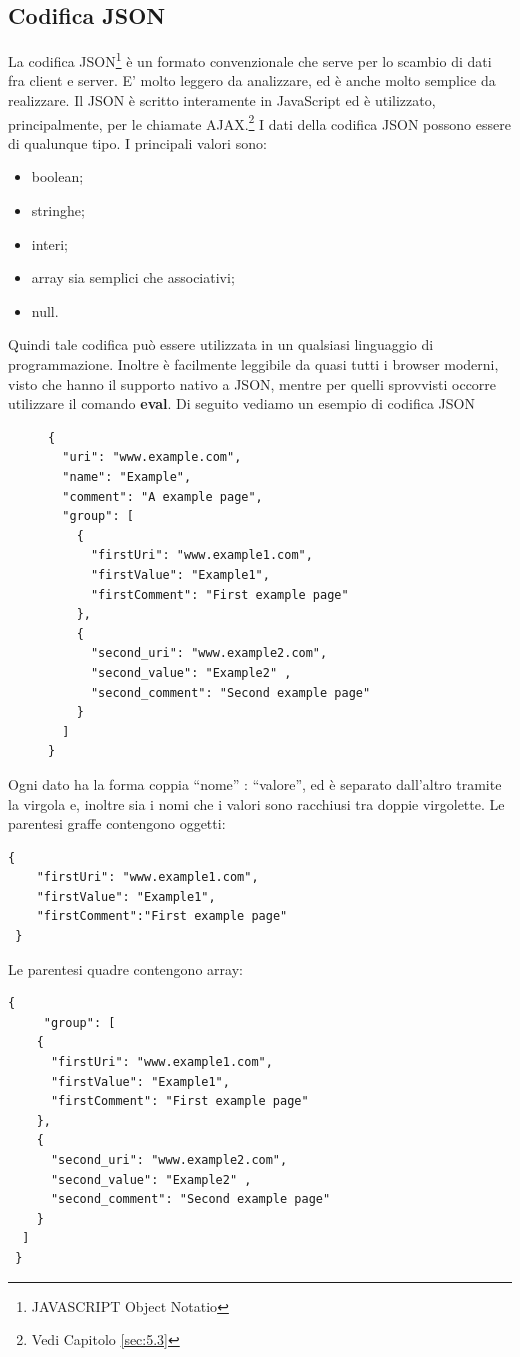 \documentclass[a4paper,11pt]{article}
\begin{document}
\subsection{Codifica JSON}
\label{sec:5.2}
La codifica JSON\footnote{JAVASCRIPT Object Notatio} è un formato convenzionale che serve per lo scambio di dati fra client e server. E' molto leggero da analizzare, ed è anche molto semplice da realizzare.
Il JSON è scritto interamente in JavaScript ed è  utilizzato, principalmente, per le chiamate AJAX.\footnote{Vedi Capitolo \ref{sec:5.3}} I dati della codifica JSON possono essere di qualunque tipo. I principali valori sono:
\begin{itemize}
	\item boolean;
	\item stringhe;
	\item interi; 
	\item array sia semplici che associativi;
	\item null.
\end{itemize} 
Quindi tale codifica può essere utilizzata in un qualsiasi linguaggio di programmazione.
Inoltre è facilmente leggibile da quasi tutti i browser moderni, visto che hanno il supporto nativo a JSON, mentre per quelli sprovvisti occorre utilizzare il comando \textbf{eval}. \newline Di seguito vediamo un esempio di codifica JSON
\begin{figure}[htb]
	\centering
		\begin{lstlisting}[style=htmlcssjs]
{
  "uri": "www.example.com",
  "name": "Example",
  "comment": "A example page",
  "group": [
    {
      "firstUri": "www.example1.com",
      "firstValue": "Example1",
      "firstComment": "First example page"       
    },   
    {
      "second_uri": "www.example2.com",
      "second_value": "Example2" ,
      "second_comment": "Second example page"
    }
  ]
}
		\end{lstlisting}
 \end{figure}\newline
Ogni dato ha la forma coppia ``nome'' : ``valore'', ed è separato dall'altro tramite la virgola e, inoltre sia i nomi che i valori sono racchiusi tra doppie virgolette.\newline
Le parentesi graffe contengono oggetti: \newline 
\begin{lstlisting}[style=htmlcssjs]
{
	"firstUri": "www.example1.com",
	"firstValue": "Example1", 					
	"firstComment":"First example page"  
 } 
\end{lstlisting}
Le parentesi quadre contengono array:
\begin{lstlisting}[style=htmlcssjs]
{
	 "group": [
    {
      "firstUri": "www.example1.com",
      "firstValue": "Example1",
      "firstComment": "First example page"       
    },   
    {
      "second_uri": "www.example2.com",
      "second_value": "Example2" ,
      "second_comment": "Second example page"
    }
  ]  
 } 
\end{lstlisting} 
\end{document}
